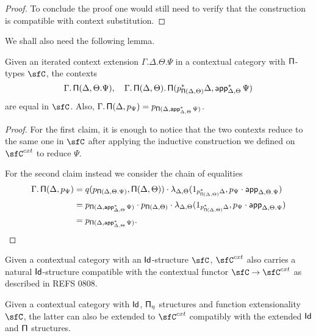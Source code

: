 \begin{proof}
  To conclude the proof one would still need to verify that the construction is
  compatible with context substitution.
\end{proof}


We shall also need the following lemma.

\begin{lem}\label{piequal}
  Given an iterated context extension $\Gamma.\Delta.\Theta.\Psi$ in a
  contextual category with $\operatorname{\mathsf{\Pi}}$-types $\sfC$, the contexts
  \[\Gamma.\operatorname{\mathsf{\Pi}}(\Delta,\Theta.\Psi),\quad\Gamma.\operatorname{\mathsf{\Pi}}(\Delta,\Theta).\operatorname{\mathsf{\Pi}}(p^*_{\operatorname{\mathsf{\Pi}}(\Delta,\Theta)}\Delta,\operatorname{\mathsf{app}}^*_{\Delta,\Theta}\Psi)\]
  are equal in $\sfC$. Also,
  $\Gamma.\operatorname{\mathsf{\Pi}}(\Delta,p_{\Psi})=p_{\operatorname{\mathsf{\Pi}}(\Delta,\operatorname{\mathsf{app}}^*_{\Delta,\Theta}\Psi)}$.
\end{lem}
\begin{proof}
  For the first claim, it is enough to notice that the two contexts reduce to
  the same one in $\sfC$ after applying the inductive construction we defined on
  $\sfC^{cxt}$ to reduce $\Psi$.

  For the second claim instead we consider the chain of equalities
  \begin{align*}
    \Gamma.\operatorname{\mathsf{\Pi}}(\Delta,p_{\Psi})
    &=q(p_{\operatorname{\mathsf{\Pi}}(\Delta,\Theta.\Psi)},\operatorname{\mathsf{\Pi}}(\Delta,\Theta))\cdot
    \lambda_{\Delta,\Theta}(1_{p^*_{\operatorname{\mathsf{\Pi}}(\Delta,\Theta)}\Delta},p_\Psi\cdot\operatorname{\mathsf{app}}_{\Delta,\Theta.\Psi}) \\
    &=p_{\operatorname{\mathsf{\Pi}}(\Delta,\operatorname{\mathsf{app}}^*_{\Delta,\Theta}\Psi)}\cdot
    p_{\operatorname{\mathsf{\Pi}}(\Delta,\Theta)}\cdot
    \lambda_{\Delta,\Theta}(1_{p^*_{\operatorname{\mathsf{\Pi}}(\Delta,\Theta)}\Delta},p_\Psi\cdot\operatorname{\mathsf{app}}_{\Delta,\Theta.\Psi}) \\
    &=p_{\operatorname{\mathsf{\Pi}}(\Delta,\operatorname{\mathsf{app}}^*_{\Delta,\Theta}\Psi)}.
  \end{align*}
\end{proof}


\begin{prop}\cite[Prop.\ 3.3.1]{Gar09b}
  Given a contextual category with an $\operatorname{\mathsf{Id}}$-structure $\sfC$, $\sfC^{cxt}$ also
  carries a natural $\operatorname{\mathsf{Id}}$-structure compatible with the contextual functor
  $\sfC\rightarrow\sfC^{cxt}$ as described in REFS 0808.
\end{prop}

\begin{lem}\cite[Lemma 2.28]{1808}
  Given a contextual category with $\operatorname{\mathsf{Id}}$, $\operatorname{\mathsf{\Pi}_\eta}$ structures and function
  extensionality $\sfC$, the latter can also be extended to $\sfC^{cxt}$
  compatibly with the extended $\operatorname{\mathsf{Id}}$ and $\operatorname{\mathsf{\Pi}}$ structures.
\end{lem}

